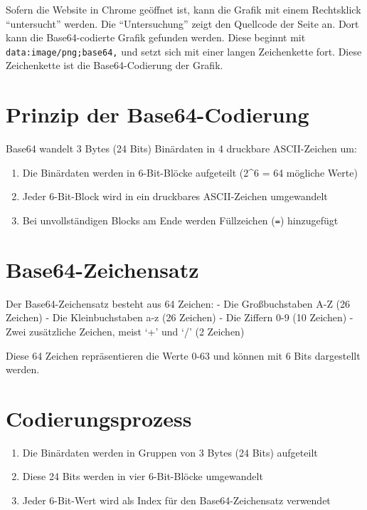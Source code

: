 \documentclass[
  nswissgerman,
  a4paper,
  DIV=11,
  numbers=noendperiod,
  ngerman]{scrreprt}
\providecommand{\tightlist}{%
  \setlength{\itemsep}{0pt}\setlength{\parskip}{0pt}}
\begin{document}
Sofern die Website in Chrome geöffnet ist, kann die Grafik mit einem
Rechtsklick ``untersucht'' werden. Die ``Untersuchung'' zeigt den
Quellcode der Seite an. Dort kann die Base64-codierte Grafik gefunden
werden. Diese beginnt mit \texttt{data:image/png;base64,} und setzt sich
mit einer langen Zeichenkette fort. Diese Zeichenkette ist die
Base64-Codierung der Grafik.

\section{Prinzip der
Base64-Codierung}\label{prinzip-der-base64-codierung}

Base64 wandelt 3 Bytes (24 Bits) Binärdaten in 4 druckbare ASCII-Zeichen
um:

\begin{enumerate}
\def\labelenumi{\arabic{enumi}.}
\tightlist
\item
  Die Binärdaten werden in 6-Bit-Blöcke aufgeteilt (2\^{}6 = 64 mögliche
  Werte)
\item
  Jeder 6-Bit-Block wird in ein druckbares ASCII-Zeichen umgewandelt
\item
  Bei unvollständigen Blocks am Ende werden Füllzeichen (\texttt{=})
  hinzugefügt
\end{enumerate}

\section{Base64-Zeichensatz}\label{base64-zeichensatz}

Der Base64-Zeichensatz besteht aus 64 Zeichen: - Die Großbuchstaben A-Z
(26 Zeichen) - Die Kleinbuchstaben a-z (26 Zeichen) - Die Ziffern 0-9
(10 Zeichen) - Zwei zusätzliche Zeichen, meist `+' und `/' (2 Zeichen)

Diese 64 Zeichen repräsentieren die Werte 0-63 und können mit 6 Bits
dargestellt werden.

\section{Codierungsprozess}\label{codierungsprozess}

\begin{enumerate}
\def\labelenumi{\arabic{enumi}.}
\tightlist
\item
  Die Binärdaten werden in Gruppen von 3 Bytes (24 Bits) aufgeteilt
\item
  Diese 24 Bits werden in vier 6-Bit-Blöcke umgewandelt
\item
  Jeder 6-Bit-Wert wird als Index für den Base64-Zeichensatz verwendet
\end{enumerate}
\end{document}
